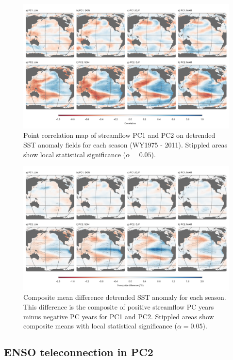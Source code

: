 \documentclass[final, double]{ua-thesis}
\begin{document}
\begin{figure}[ht]
\centering
\centerline{\includegraphics[width=190mm]{p1figures/fig4.pdf}}
\caption{Point correlation map of streamflow PC1 and PC2 on detrended SST anomaly fields for each season (WY1975 - 2011). Stippled areas show local statistical significance ($\alpha = 0.05$).}
\label{fig:corrsst}
\end{figure}

\begin{figure}[ht]
\centering
\centerline{\includegraphics[width=190mm]{p1figures/fig5.pdf}}
\caption{Composite mean difference detrended SST anomaly for each season. This difference is the composite of positive streamflow PC years minus negative PC years for PC1 and PC2. Stippled areas show composite means with local statistical significance ($\alpha = 0.05$).}
\label{fig:compsst}
\end{figure}

\subsection{ENSO teleconnection in PC2}
\end{document}
